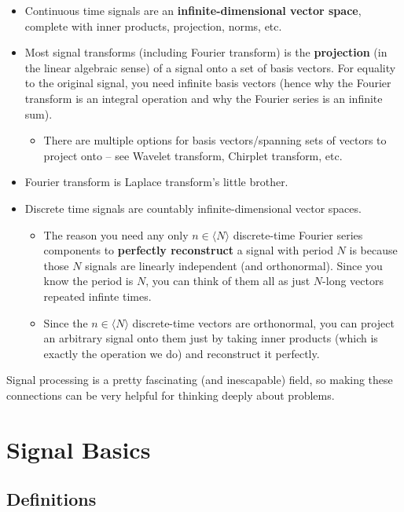 \documentclass[a4paper,12pt]{report}
\begin{document}
\begin{itemize}
\item Continuous time signals are an \textbf{infinite-dimensional vector space}, complete with inner products, projection, norms, etc.
\item Most signal transforms (including Fourier transform) is the \textbf{projection} (in the linear algebraic sense) of a signal onto a set of basis vectors. For equality to the original signal, you need infinite basis vectors (hence why the Fourier transform is an integral operation and why the Fourier series is an infinite sum).
\begin{itemize}
\item There are multiple options for basis vectors/spanning sets of vectors to project onto -- see Wavelet transform, Chirplet transform, etc.
\end{itemize}
\item Fourier transform is Laplace transform's little brother.
\item Discrete time signals are countably infinite-dimensional vector spaces. 
\begin{itemize}
\item The reason you need any only $n\in \langle N \rangle$ discrete-time Fourier series components to \textbf{perfectly reconstruct} a signal with period $N$ is because those $N$ signals are linearly independent (and orthonormal). Since you know the period is $N$, you can think of them all as just $N$-long vectors repeated infinte times. 
\item Since the $n\in \langle N \rangle$ discrete-time vectors are orthonormal, you can project an arbitrary signal onto them just by taking inner products (which is exactly the operation we do) and reconstruct it perfectly. 
\end{itemize}
\end{itemize}

Signal processing is a pretty fascinating (and inescapable) field, so making these connections can be very helpful for thinking deeply about problems. 






\chapter{Signal Basics}

\section{Definitions}
\end{document}
